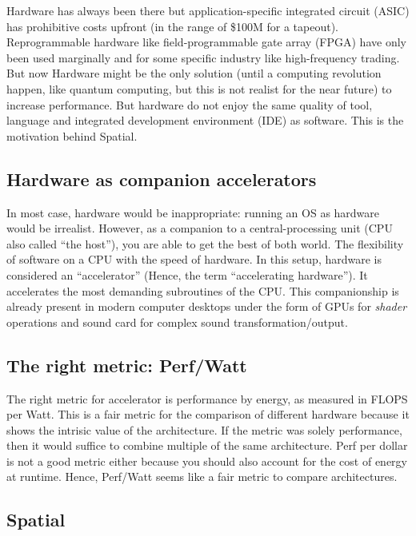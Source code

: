 \documentclass[]{article}
\begin{document}
Hardware has always been there but application-specific integrated
circuit (ASIC) has prohibitive costs upfront (in the range of \$100M for
a tapeout). Reprogrammable hardware like field-programmable gate array
(FPGA) have only been used marginally and for some specific industry
like high-frequency trading. But now Hardware might be the only solution
(until a computing revolution happen, like quantum computing, but this
is not realist for the near future) to increase performance. But
hardware do not enjoy the same quality of tool, language and integrated
development environment (IDE) as software. This is the motivation behind
Spatial.

\subsection{Hardware as companion
accelerators}\label{hardware-as-companion-accelerators}

In most case, hardware would be inappropriate: running an OS as hardware
would be irrealist. However, as a companion to a central-processing unit
(CPU also called ``the host''), you are able to get the best of both
world. The flexibility of software on a CPU with the speed of hardware.
In this setup, hardware is considered an ``accelerator'' (Hence, the
term ``accelerating hardware''). It accelerates the most demanding
subroutines of the CPU. This companionship is already present in modern
computer desktops under the form of GPUs for \emph{shader} operations
and sound card for complex sound transformation/output.

\subsection{The right metric:
Perf/Watt}\label{the-right-metric-perfwatt}

The right metric for accelerator is performance by energy, as measured
in FLOPS per Watt. This is a fair metric for the comparison of different
hardware because it shows the intrisic value of the architecture. If the
metric was solely performance, then it would suffice to combine multiple
of the same architecture. Perf per dollar is not a good metric either
because you should also account for the cost of energy at runtime.
Hence, Perf/Watt seems like a fair metric to compare architectures.

\subsection{Spatial}\label{spatial}
\end{document}
